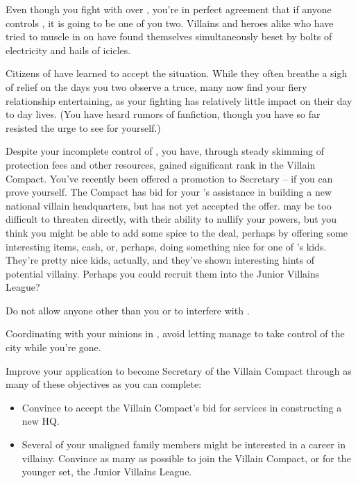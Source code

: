 \documentclass[char]{LRSguildcamp1}
\begin{document}
Even though you fight with \cOS{} over \pCityO{}, you're in perfect agreement that if anyone controls \pCityO{}, it is going to be one of you two.  Villains and heroes alike who have tried to muscle in on \pCityO{} have found themselves simultaneously beset by bolts of electricity and hails of icicles.

Citizens of \pCityO{} have learned to accept the situation. While they often breathe a sigh of relief on the days you two observe a truce, many now find your fiery relationship entertaining, as your fighting has relatively little impact on their day to day lives.  (You have heard rumors of fanfiction, though you have so far resisted the urge to see for yourself.)

Despite your incomplete control of \pCityO{}, you have, through steady skimming of protection fees and other resources, gained significant rank in the Villain Compact.  You've recently been offered a promotion to Secretary -- if you can prove yourself.  The Compact has bid for your \cArchitect{\sibling} \cArchitect{}'s assistance in building a new national villain headquarters, but \cArchitect{} has not yet accepted the offer.  \cArchitect{} may be too difficult to threaten directly, with their ability to nullify your powers, but you think you might be able to add some spice to the deal, perhaps by offering some interesting items, cash, or, perhaps, doing something nice for one of \cArchitect{}'s kids.  They're pretty nice kids, actually, and they've shown interesting hints of potential villainy.  Perhaps you could recruit them into the Junior Villains League?

\begin{itemz}[Goals]
	\item Do not allow anyone other than you or \cOS{} to interfere with \pCityO{}.
	\item Coordinating with your minions in \pCityO{}, avoid letting \cOS{} manage to take control of the city while you're gone.
	\item Improve your application to become Secretary of the Villain Compact through as many of these objectives as you can complete:
	\begin{itemize}
		\item Convince \cArchitect{} to accept the Villain Compact's bid for \cArchitect{\their} services in constructing a new HQ.
		\item Several of your unaligned family members might be interested in a career in villainy.  Convince as many as possible to join the Villain Compact, or for the younger set, the Junior Villains League.
	\end{itemize}
\end{itemz}
\end{document}
